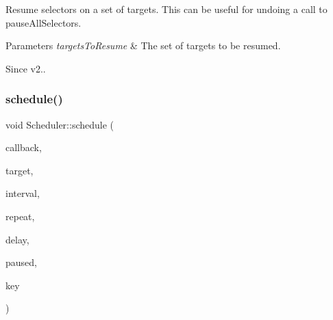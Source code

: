 Resume selectors on a set of targets. This can be useful for undoing a call to pause\+All\+Selectors. 
\begin{DoxyParams}{Parameters}
{\em targets\+To\+Resume} & The set of targets to be resumed. \\
\hline
\end{DoxyParams}
\begin{DoxySince}{Since}
v2.. 
\end{DoxySince}
\mbox{\label{classScheduler_a0d52145629a67e888cf1b25fd01f668b}} 
\subsubsection{\texorpdfstring{schedule()}{schedule()}\hspace{0.1cm}{\footnotesize\ttfamily [1/8]}}
{\footnotesize\ttfamily void Scheduler\+::schedule (\begin{DoxyParamCaption}\item[{const cc\+Scheduler\+Func \&}]{callback,  }\item[{void $\ast$}]{target,  }\item[{float}]{interval,  }\item[{unsigned int}]{repeat,  }\item[{float}]{delay,  }\item[{bool}]{paused,  }\item[{const std\+::string \&}]{key }\end{DoxyParamCaption})}

